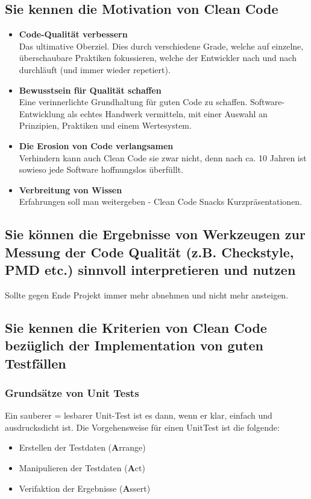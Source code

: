 \subsection{Sie kennen die Motivation von Clean Code}
\begin{itemize}
  \item \textbf{Code-Qualität verbessern} \\
  Das ultimative Oberziel. Dies durch verschiedene Grade, welche auf einzelne, überschaubare Praktiken fokussieren, welche der Entwickler nach und nach durchläuft (und immer wieder repetiert).
  \item \textbf{Bewusstsein für Qualität schaffen} \\
  Eine verinnerlichte Grundhaltung für guten Code zu schaffen. Software-Entwicklung als echtes Handwerk vermitteln, mit einer Auswahl an Prinzipien, Praktiken und einem Wertesystem.
  \item \textbf{Die Erosion von Code verlangsamen} \\
   Verhindern kann auch Clean Code sie zwar nicht, denn nach ca. 10 Jahren ist sowieso jede Software hoffnungslos überfüllt. 
   \item \textbf{Verbreitung von Wissen} \\
   Erfahrungen soll man weitergeben - Clean Code Snacks Kurzpräsentationen.
\end{itemize}

\subsection{Sie können die Ergebnisse von Werkzeugen zur Messung der Code Qualität (z.B. Checkstyle, PMD etc.) sinnvoll interpretieren und nutzen}

Sollte gegen Ende Projekt immer mehr abnehmen und nicht mehr ansteigen.

\subsection{Sie kennen die Kriterien von Clean Code bezüglich der Implementation von guten Testfällen}

\subsubsection{Grundsätze von Unit Tests}
Ein sauberer = lesbarer Unit-Test ist es dann, wenn er klar, einfach und ausdrucksdicht ist. Die Vorgehensweise für einen UnitTest ist die folgende:
\begin{itemize}
  \item Erstellen der Testdaten (\textbf{A}rrange)
  \item Manipulieren der Testdaten (\textbf{A}ct)
  \item Verifaktion der Ergebnisse (\textbf{A}ssert)
\end{itemize}

